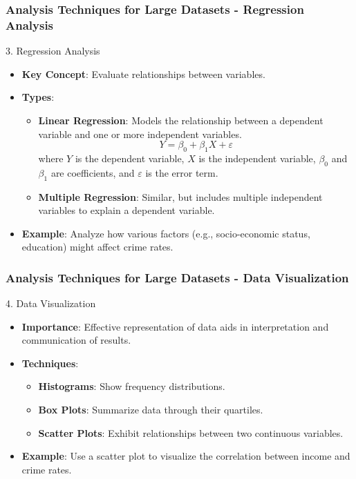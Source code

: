 \documentclass[aspectratio=169]{beamer}
\begin{document}
\begin{frame}[fragile]
    \frametitle{Analysis Techniques for Large Datasets - Regression Analysis}
    \begin{block}{3. Regression Analysis}
        \begin{itemize}
            \item \textbf{Key Concept}: Evaluate relationships between variables.
            \item \textbf{Types}:
            \begin{itemize}
                \item \textbf{Linear Regression}: Models the relationship between a dependent variable and one or more independent variables.
                \begin{equation}
                    Y = \beta_0 + \beta_1X + \varepsilon
                \end{equation}
                where \( Y \) is the dependent variable, \( X \) is the independent variable, \( \beta_0 \) and \( \beta_1 \) are coefficients, and \( \varepsilon \) is the error term.
                \item \textbf{Multiple Regression}: Similar, but includes multiple independent variables to explain a dependent variable.
            \end{itemize}
            \item \textbf{Example}: Analyze how various factors (e.g., socio-economic status, education) might affect crime rates.
        \end{itemize}
    \end{block}
\end{frame}

\begin{frame}[fragile]
    \frametitle{Analysis Techniques for Large Datasets - Data Visualization}
    \begin{block}{4. Data Visualization}
        \begin{itemize}
            \item \textbf{Importance}: Effective representation of data aids in interpretation and communication of results.
            \item \textbf{Techniques}:
            \begin{itemize}
                \item \textbf{Histograms}: Show frequency distributions.
                \item \textbf{Box Plots}: Summarize data through their quartiles.
                \item \textbf{Scatter Plots}: Exhibit relationships between two continuous variables.
            \end{itemize}
            \item \textbf{Example}: Use a scatter plot to visualize the correlation between income and crime rates.
        \end{itemize}
    \end{block}
\end{frame}
\end{document}

